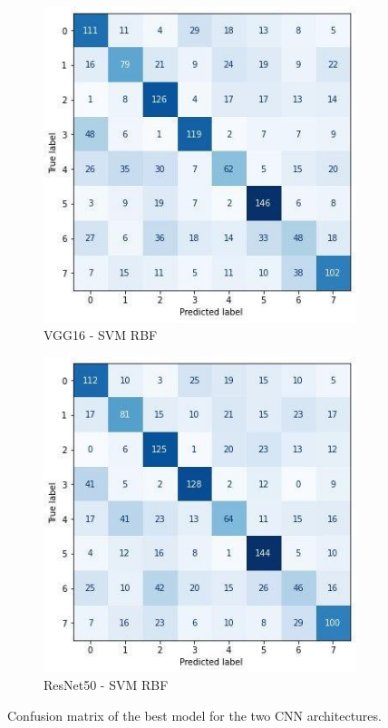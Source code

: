 \begin{figure}
  \begin{subfigure}[c]{0.475\textwidth}
    \centering
    \includegraphics[width=\textwidth]{images/best_vgg16_svmrbf.jpg}
    \caption{VGG16 - SVM RBF}
    \label{fig:best_vgg16_svmrbf_cm}
  \end{subfigure}
  \hfill
  \begin{subfigure}[c]{0.475\textwidth}
    \centering
    \includegraphics[width=\textwidth]{images/best_resnet50_svmrbf.jpg}
    \caption{ResNet50 - SVM RBF}
    \label{fig:best_resnet50_svmrbf_cm}
  \end{subfigure}
  \caption{Confusion matrix of the best model for the two CNN architectures.}
\end{figure}

